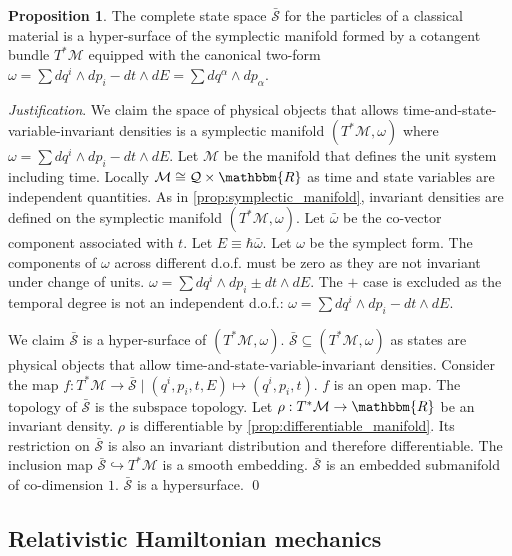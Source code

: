 \documentclass[aps,pra,10pt,twocolumn,floatfix,nofootinbib]{revtex4-1}
\numberwithin{equation}{section}
\theoremstyle{definition}
\newtheorem{prop}[equation]{Proposition}
\newenvironment{justification}{\emph{Justification}.}{\qed}
\begin{document}
\begin{prop}\label{prop:relativistic_symplectic_manifold}
	The complete state space $\bar{\mathcal{S}}$ for the particles of a classical material is a hyper-surface of the symplectic manifold formed by a cotangent bundle $T^*\mathcal{M}$ equipped with the canonical two-form $\omega = \sum dq^i \wedge dp_i - dt \wedge dE = \sum dq^\alpha \wedge dp_\alpha$.
\end{prop}

\begin{justification}
	We claim the space of physical objects that allows time-and-state-variable-invariant densities is a symplectic manifold $(T^*\mathcal{M}, \omega)$ where $\omega = \sum dq^i \wedge dp_i - dt \wedge dE$. Let $\mathcal{M}$ be the manifold that defines the unit system including time. Locally $\mathcal{M} \cong \mathcal{Q} \times \mathbbm{R}$ as time and state variables are independent quantities. As in \ref{prop:symplectic_manifold}, invariant densities are defined on the symplectic manifold $(T^*\mathcal{M}, \omega)$. Let $\bar{\omega}$ be the co-vector component associated with $t$. Let $E\equiv\hbar \bar{\omega}$. Let $\omega$ be the symplect form. The components of $\omega$ across different d.o.f. must be zero as they are not invariant under change of units. $\omega=\sum dq^i \wedge dp_i \pm dt \wedge dE$. The $+$ case is excluded as the temporal degree is not an independent d.o.f.: $\omega = \sum dq^i \wedge dp_i - dt \wedge dE$.
	
	We claim $\bar{\mathcal{S}}$ is a hyper-surface of $(T^*\mathcal{M}, \omega)$. $\bar{\mathcal{S}} \subseteq (T^*\mathcal{M}, \omega)$ as states are physical objects that allow time-and-state-variable-invariant densities. Consider the map $f : T^*\mathcal{M} \rightarrow \bar{\mathcal{S}} \; | \; (q^i, p_i, t, E) \mapsto (q^i, p_i, t)$. $f$ is an open map. The topology of $\bar{\mathcal{S}}$ is the subspace topology. Let $\rho : T^*\mathcal{M} \rightarrow \mathbbm{R}$ be an invariant density. $\rho$ is differentiable by \ref{prop:differentiable_manifold}. Its restriction on $\bar{\mathcal{S}}$ is also an invariant distribution and therefore differentiable. The inclusion map $\bar{\mathcal{S}} \hookrightarrow T^*\mathcal{M}$ is a smooth embedding. $\bar{\mathcal{S}}$ is an embedded submanifold of co-dimension $1$. $\bar{\mathcal{S}}$ is a hypersurface.
\end{justification}


\subsection{Relativistic Hamiltonian mechanics}
\end{document}
